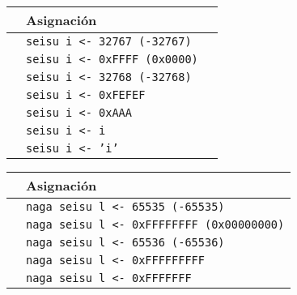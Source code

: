 \documentclass[spanish]{article}
\begin{document}
\begin{figure}[H]
  \centering
  \begin{minipage}{.5\textwidth}
    \centering

    \begin{tabular}{ | c | l | l |}
      \hline
      & Asignación\\ \hline
      \color{green}{V} & \texttt{seisu i <- 32767 (-32767)} \\ \hline
      \color{green}{V} & \texttt{seisu i <- 0xFFFF (0x0000)} \\ \hline
      \hline
      \color{red}{X} & \texttt{seisu i <- 32768 (-32768)} \\ \hline
      \color{red}{X} & \texttt{seisu i <- 0xFEFEF} \\ \hline
      \color{red}{X} & \texttt{seisu i <- 0xAAA} \\ \hline
      \color{red}{X} & \texttt{seisu i <- i} \\ \hline
      \color{red}{X} & \texttt{seisu i <- 'i'} \\
      \hline
    \end{tabular}

  \end{minipage}%
  \begin{minipage}{.5\textwidth}
    \centering

    \begin{tabular}{ | c | l |}
      \hline
      & Asignación\\ \hline
      \color{green}{V} & \texttt{naga seisu l <- 65535 (-65535)}           \\ \hline
      \color{green}{V} & \texttt{naga seisu l <- 0xFFFFFFFF (0x00000000)}  \\ \hline
      \hline
      \color{red}{X} & \texttt{naga seisu l <- 65536 (-65536)}           \\ \hline
      \color{red}{X} & \texttt{naga seisu l <- 0xFFFFFFFFF}              \\ \hline
      \color{red}{X} & \texttt{naga seisu l <- 0xFFFFFFF}                \\
      \hline
    \end{tabular}

  \end{minipage}
\end{figure}
\end{document}
